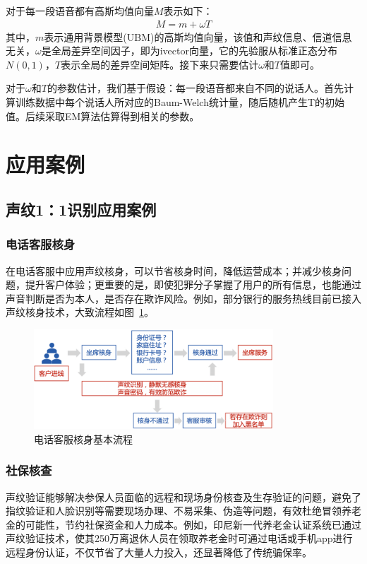 对于每一段语音都有高斯均值向量$M$表示如下：
\begin{equation}
\label{eq:ivector}
\begin{aligned}
M = m + \omega T
\end{aligned}
\end{equation}
其中，$m$表示通用背景模型(UBM)的高斯均值向量，该值和声纹信息、信道信息无关，$\omega$是全局差异空间因子，即为ivector向量，它的先验服从标准正态分布$N(0,1)$，$T$表示全局的差异空间矩阵。接下来只需要估计$\omega$和$T$值即可。

对于$\omega$和$T$的参数估计，我们基于假设：每一段语音都来自不同的说话人。首先计算训练数据中每个说话人所对应的Baum-Welch统计量，随后随机产生T的初始值。后续采取EM算法估算得到相关的参数。


\section{应用案例}
\subsection{声纹1：1识别应用案例}
\subsubsection{电话客服核身}
在电话客服中应用声纹核身，可以节省核身时间，降低运营成本；并减少核身问题，提升客户体验；更重要的是，即使犯罪分子掌握了用户的所有信息，也能通过声音判断是否为本人，是否存在欺诈风险。例如，部分银行的服务热线目前已接入声纹核身技术，大致流程如图~\ref{pic:vprapp1}。

\begin{figure}[h!]
	\begin{center}
		\includegraphics[width=0.8\textwidth]{img/chapter_voiceprint/vpr_app1.png}
		\caption{电话客服核身基本流程}
		\label{pic:vprapp1}
	\end{center}
\end{figure}

\subsubsection{社保核查}
声纹验证能够解决参保人员面临的远程和现场身份核查及生存验证的问题，避免了指纹验证和人脸识别等需要现场办理、不易采集、伪造等问题，有效杜绝冒领养老金的可能性，节约社保资金和人力成本。例如，印尼新一代养老金认证系统已通过声纹验证技术，使其250万离退休人员在领取养老金时可通过电话或手机app进行远程身份认证，不仅节省了大量人力投入，还显著降低了传统骗保率。

